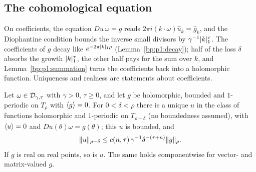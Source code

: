 \subsection{The cohomological equation}\label{bp:p1:sec-cohomological}

On coefficients, the equation $Du\,\omega=g$ reads $2\pi i(k\cdot\omega)\hat u_k=\hat g_k$, and the
Diophantine condition bounds the inverse small divisors by $\gamma^{-1}\lvert k\rvert_1^\tau$. The coefficients
of $g$ decay like $e^{-2\pi\lvert k\rvert_1\rho}$ (Lemma~\ref{bp:p1:decay}); half of the loss $\delta$ absorbs the
growth $\lvert k\rvert_1^\tau$, the other half pays for the sum over $k$, and Lemma~\ref{bp:p1:summation} turns
the coefficients back into a holomorphic function. Uniqueness and realness are statements about
coefficients.

\begin{lemma}\label{bp:p1:cohomological}
Let $\omega\in\mathcal{D}_{\gamma,\tau}$ with $\gamma>0$, $\tau\ge0$, and let $g$ be holomorphic, bounded
and $1$-periodic on $T_\rho$ with $\langle g\rangle=0$. For $0<\delta<\rho$ there is a unique $u$ in the class of functions
holomorphic and $1$-periodic on $T_{\rho-\delta}$ (no boundedness assumed), with $\langle u\rangle=0$ and
$Du(\theta)\omega=g(\theta)$; this $u$ is bounded, and
\[\lVert u\rVert_{\rho-\delta}\le c(n,\tau)\,\gamma^{-1}\delta^{-(\tau+n)}\lVert g\rVert_\rho.\]
If $g$ is real on real points, so is $u$. The same holds componentwise for vector- and
matrix-valued $g$.
\end{lemma}


